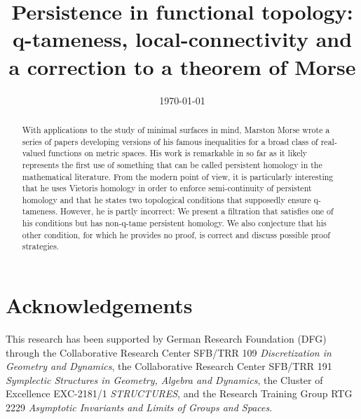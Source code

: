 \documentclass{amsart}
\theoremstyle{plain}
\theoremstyle{definition}
\begin{document}
\title[Persistence in functional topology]{Persistence in functional topology: q-tameness, local-connectivity and a correction to a theorem of Morse}
\author{}
\date{\today}

\begin{abstract}
With applications to the study of minimal surfaces in mind, Marston Morse wrote a series of papers developing versions of his famous inequalities for a broad class of real-valued functions on metric spaces. His work is remarkable in so far as it likely represents the first use of something that can be called persistent homology in the mathematical literature. From the modern point of view, it is particularly interesting that he uses Vietoris homology in order to enforce semi-continuity of persistent homology and that he states two topological conditions that supposedly ensure q-tameness. However, he is partly incorrect: We present a filtration that satisfies one of his conditions but has non-q-tame persistent homology. We also conjecture that his other condition, for which he provides no proof, is correct and discuss possible proof strategies.
\end{abstract}

\maketitle







%

\section*{Acknowledgements}
This research has been supported by German Research Foundation (DFG) through the Collaborative Research Center SFB/TRR 109 \emph{Discretization in Geometry and Dynamics}, the Collaborative Research Center SFB/TRR 191 \emph{Symplectic Structures in Geometry, Algebra and Dynamics}, the Cluster of Excellence EXC-2181/1 \emph{STRUCTURES}, and the Research Training Group RTG 2229 \emph{Asymptotic Invariants and Limits of Groups and Spaces}.




\todos
\end{document}
